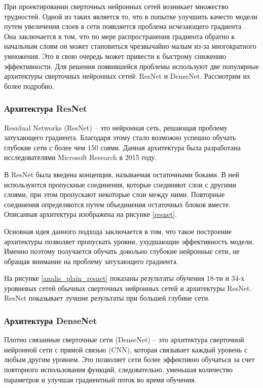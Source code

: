 При проектировании сверточных нейронных сетей возникает множество трудностей. Одной из таких является то, что в попытке улучшить качесто модели путем увеличения слоев в сети появляется проблема исчезающего градиента \cite{bib:gradient:1}. Она заключается в том, что по мере распространения градиента обратно к начальным слоям он может становиться чрезвычайно малым из-за многократного умножения. Это в свою очередь может привести к быстрому снижению эффективности. Для решения появившейся проблемы используют две популярные архитектуры сверточных нейронных сетей: ResNet и DenseNet. Рассмотрим их более подробно.

\subsubsection{Архитектура ResNet}

Residual Networks (ResNet) – это нейронная сеть, решающая проблему затухающего градиента. Благодаря этому стало возможно успешно обучать глубокие сети с более чем 150 соями. Данная архитектура была разработана исследователями Microsoft Research в 2015 году.

В ResNet была введена концепция, называемая остаточными боками. В ней используются пропускные соединения, которые соединяют слои с другими слоями, при этом пропускают некоторые слои между ними. Повторные соединения определяются путем объединения остаточных блоков вместе. Описанная архитектура изображена на рисунке \ref{resnet}.


Основная идея данного подхода заключается в том, что такое построение архитектуры позволяет пропускать уровни, ухудшающие эффективность модели. Именно поэтому получается обучать довольно глубокие нейронные сети, не обращая внимание на проблему затухающего градиента.

На рисунке \ref{analis_plain_resnet} показаны результаты обучения 18-ти и 34-х уровневых сетей обычных сверточных нейронных сетей и архитектуры ResNet. ResNet показывает лучшие результаты при большей глубине сети.

\subsubsection{Архитектура DenseNet}

Плотно связанные сверточные сети (DenseNet) – это архитектура сверточной нейронной сети с прямой связью (CNN), которая связывает каждый уровень с любым другим уровнем. Это позволяет сети более эффективно обучаться за счет повторного использования функций, следовательно, уменьшая количество параметров и улучшая градиентный поток во время обучения.

